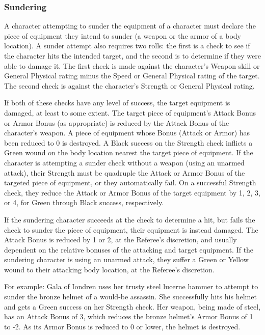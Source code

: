 \documentclass[oneside]{book}
\begin{document}
\begin{multicols}{2}
\subsubsection{Sundering}
A character attempting to sunder the equipment of a character must declare the piece of equipment they intend to sunder (a weapon or the armor of a body location). A sunder attempt also requires two rolls: the first is a check to see if the character hits the intended target, and the second is to determine if they were able to damage it. The first check is made against the character's Weapon skill or General Physical rating minus the Speed or General Physical rating of the target. The second check is against the character's Strength or General Physical rating. 

If both of these checks have any level of success, the target equipment is damaged, at least to some extent. The target piece of equipment's Attack Bonus or Armor Bonus (as appropriate) is reduced by the Attack Bonus of the character's weapon. A piece of equipment whose Bonus (Attack or Armor) has been reduced to 0 is destroyed. A Black success on the Strength check inflicts a Green wound on the body location nearest the target piece of equipment. If the character is attempting a sunder check without a weapon (using an unarmed attack), their Strength must be quadruple the Attack or Armor Bonus of the targeted piece of equipment, or they automatically fail. On a successful Strength check, they reduce the Attack or Armor Bonus of the target equipment by 1, 2, 3, or 4, for Green through Black success, respectively.

If the sundering character succeeds at the check to determine a hit, but fails the check to sunder the piece of equipment, their equipment is instead damaged. The Attack Bonus is reduced by 1 or 2, at the Referee's discretion, and usually dependent on the relative bonuses of the attacking and target equipment. If the sundering character is using an unarmed attack, they suffer a Green or Yellow wound to their attacking body location, at the Referee's discretion.

For example: Gala of Iondren uses her trusty steel lucerne hammer to attempt to sunder the bronze helmet of a would-be assassin. She successfully hits his helmet and gets a Green success on her Strength check. Her weapon, being made of steel, has an Attack Bonus of 3, which reduces the bronze helmet's Armor Bonus of 1 to -2. As its Armor Bonus is reduced to 0 or lower, the helmet is destroyed. 


\end{multicols}
\end{document}
